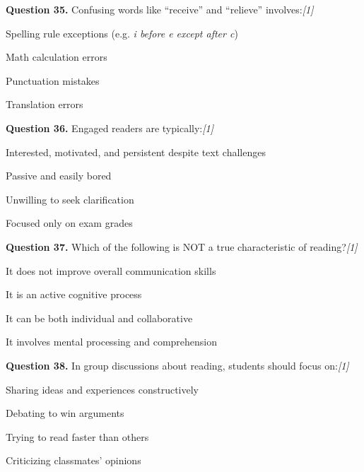 \documentclass[11pt,a4paper]{article}
\newcommand{\pts}[1]{\hfill   \textit{[#1]}}
\begin{document}
\medskip




\noindent   \textbf{Question 35.} Confusing words like ``receive'' and ``relieve'' involves:\pts{1}

\begin{parts}
  \item Spelling rule exceptions (e.g.   \textit{i before e except after c})
  \item Math calculation errors
  \item Punctuation mistakes
  \item Translation errors
\end{parts}

\medskip




\noindent   \textbf{Question 36.} Engaged readers are typically:\pts{1}

\begin{parts}
  \item Interested, motivated, and persistent despite text challenges
  \item Passive and easily bored
  \item Unwilling to seek clarification
  \item Focused only on exam grades
\end{parts}

\medskip




\noindent   \textbf{Question 37.} Which of the following is NOT a true characteristic of reading?\pts{1}

\begin{parts}
  \item It does not improve overall communication skills
  \item It is an active cognitive process
  \item It can be both individual and collaborative
  \item It involves mental processing and comprehension
\end{parts}

\medskip




\noindent   \textbf{Question 38.} In group discussions about reading, students should focus on:\pts{1}

\begin{parts}
  \item Sharing ideas and experiences constructively
  \item Debating to win arguments
  \item Trying to read faster than others
  \item Criticizing classmates' opinions
\end{parts}
\end{document}
